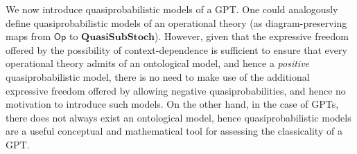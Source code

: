 \documentclass[10pt,twocolumn,aps,groupedaddress,nofootinbib]{revtex4}
\newcommand\Op{\mathsf{Op}}
\newcommand\QSS{\mathbf{QuasiSubStoch}}
\begin{document}
We now introduce quasiprobabilistic models of a GPT. One could analogously define quasiprobabilistic models of an operational theory (as diagram-preserving maps from $\Op$ to $\QSS$).  However, given that the expressive freedom offered by the possibility of context-dependence is sufficient to ensure that every operational theory admits of an ontological model, and hence a {\em positive} quasiprobabilistic model, there is no need to make use of the additional expressive freedom offered by allowing negative quasiprobabilities, and hence no motivation to introduce such models.
On the other hand, in the case of GPTs, there does not always exist an ontological model, hence quasiprobabilistic models are a useful conceptual and mathematical tool for assessing the classicality of a GPT.
\end{document}
